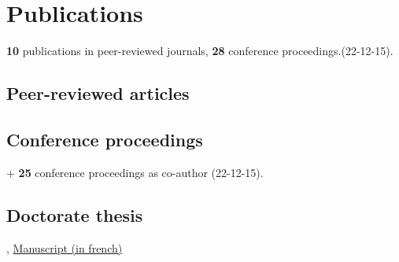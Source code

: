 \section{Publications}
\textbf{10} publications in peer-reviewed journals, \textbf{28} conference proceedings.(22-12-15).

\subsection{Peer-reviewed articles}

\tabitem {}

\tabitem {}

\tabitem {}

\tabitem {}

\tabitem {}

\tabitem {}

\tabitem {}

\tabitem {}

\tabitem {}

\tabitem {}

\subsection{Conference proceedings}
\tabitem {}

\tabitem {}

\tabitem {}

$+$ \textbf{25} conference proceedings as co-author (22-12-15).

\subsection{Doctorate thesis}
, \href{https://raw.githubusercontent.com/fkeruzore/PhDThesis-public/main/manuscrit.pdf}{Manuscript (in french)}

